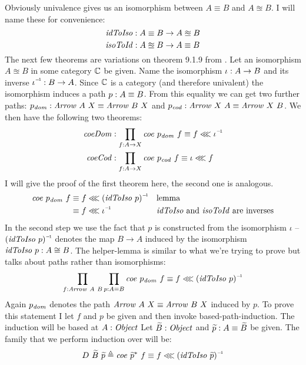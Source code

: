 Obviously univalence gives us an isomorphism between $A \equiv B$ and $A
\approxeq B$. I will name these for convenience:
%
$$
\idToIso \tp A \equiv B \to A \approxeq B
$$
%
$$
\isoToId \tp A \approxeq B \to A \equiv B
$$
%
The next few theorems are variations on theorem 9.1.9 from \cite{hott-2013}. Let
an isomorphism $A \approxeq B$ in some category $\mathbb{C}$ be given. Name the
isomorphism $\iota \mathrel{:} A \to B$ and its inverse $\inv{\iota} \tp B \to A$.
Since $\mathbb{C}$ is a category (and therefore univalent) the isomorphism induces a
path $p \mathrel{:} A \equiv B$. From this equality we can get two further paths:
$p_{\var{dom}} \tp \Arrow\ A\ X \equiv \Arrow\ B\ X$ and
$p_{\var{cod}} \tp \Arrow\ X\ A \equiv \Arrow\ X\ B$. We
then have the following two theorems:
%
\begin{align}
\label{eq:coeDom}
\var{coeDom} & \tp \prod_{f \tp A \to X}
\var{coe}\ p_{\var{dom}}\ f \equiv f \lll \inv{\iota}
\\
\label{eq:coeCod}
\var{coeCod} & \tp \prod_{f \tp A \to X}
\var{coe}\ p_{\var{cod}}\ f \equiv \iota \lll f
\end{align}
%
I will give the proof of the first theorem here, the second one is analogous.
%
\begin{align*}
\var{coe}\ p_{\var{dom}}\ f
  & \equiv f \lll \inv{(\idToIso\ p)} && \text{lemma} \\
  & \equiv f \lll \inv{\iota}
    && \text{$\idToIso$ and $\isoToId$ are inverses}\\
\end{align*}
%
In the second step we use the fact that $p$ is constructed from the isomorphism
$\iota$ -- $\inv{(\idToIso\ p)}$ denotes the map $B \to A$ induced by the
isomorphism $\idToIso\ p \tp A \cong B$. The helper-lemma is similar to
what we're trying to prove but talks about paths rather than isomorphisms:
%
\begin{equation}
\label{eq:coeDomIso}
\prod_{f \tp \Arrow\ A\ B} \prod_{p \tp A \equiv B}
\var{coe}\ p_{\var{dom}}\ f \equiv f \lll \inv{(\idToIso\ p)}
\end{equation}
%
Again $p_{\mathit{dom}}$ denotes the path $\Arrow\ A\ X \equiv
\Arrow\ B\ X$ induced by $p$. To prove this statement I let $f$ and $p$ be
given and then invoke based-path-induction. The induction will be based at $A
\tp \Object$ Let $\widetilde{B} \tp \Object$ and $\widetilde{p} \mathrel{:} A
\equiv \widetilde{B}$ be given. The family that we perform induction over will
be:
%
\begin{align}
D\ \widetilde{B}\ \widetilde{p} \defeq
  \var{coe}\ {\widetilde{p}}^*\ f
\equiv
f \lll \inv{(\idToIso\ \widetilde{p})}
\end{align}
